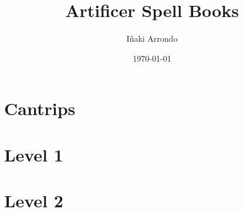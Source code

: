 \documentclass[a5paper,18pt]{book}
\title{Artificer Spell Books}
\author{Iñaki Arrondo}
\date{\today}
\begin{document}
\large

\maketitle

\tableofcontents
\chapter{Cantrips}























\chapter{Level 1}


















\chapter{Level 2}
























\end{document}

